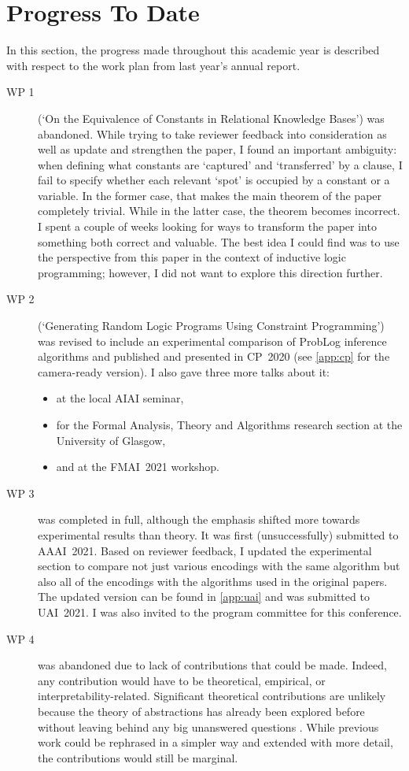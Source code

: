\documentclass{article}
\begin{document}
\section{Progress To Date}

In this section, the progress made throughout this academic year is described
with respect to the work plan from last year's annual report.

\begin{description}
\item[WP 1] (`On the Equivalence of Constants in Relational Knowledge Bases')
  was abandoned. While trying to take reviewer feedback into consideration as
  well as update and strengthen the paper, I found an important ambiguity: when
  defining what constants are `captured' and `transferred' by a clause, I fail
  to specify whether each relevant `spot' is occupied by a constant or a
  variable. In the former case, that makes the main theorem of the paper
  completely trivial. While in the latter case, the theorem becomes incorrect. I
  spent a couple of weeks looking for ways to transform the paper into something
  both correct and valuable. The best idea I could find was to use the
  perspective from this paper in the context of inductive logic programming;
  however, I did not want to explore this direction further.
\item[WP 2] (`Generating Random Logic Programs Using Constraint
  Programming') was revised to include an experimental comparison of ProbLog
  inference algorithms and published and presented in CP~2020 (see \cref{app:cp}
  for the camera-ready version). I also gave three more talks about it:
  \begin{itemize}
  \item at the local AIAI seminar,
  \item for the Formal Analysis, Theory and Algorithms research section at the
    University of Glasgow,
  \item and at the FMAI~2021 workshop.
  \end{itemize}
\item[WP 3] was completed in full, although the emphasis shifted more towards
  experimental results than theory. It was first (unsuccessfully) submitted to
  AAAI~2021. Based on reviewer feedback, I updated the experimental section to
  compare not just various encodings with the same algorithm but also all of the
  encodings with the algorithms used in the original papers. The updated version
  can be found in \cref{app:uai} and was submitted to UAI~2021. I was also
  invited to the program committee for this conference.
\item[WP 4] was abandoned due to lack of contributions that could be made.
  Indeed, any contribution would have to be theoretical, empirical, or
  interpretability-related. Significant theoretical contributions are unlikely
  because the theory of abstractions has already been explored before without
  leaving behind any big unanswered questions \cite{DBLP:journals/kbs/Belle20}.
  While previous work could be rephrased in a simpler way and extended with more
  detail, the contributions would still be marginal.


\end{description}
\end{document}
